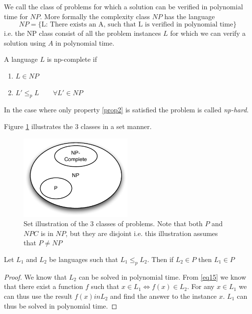 \documentclass[10pt]{article}
\begin{document}
We call the class of problems for which a solution can be verified in polynomial time for $NP$. More formally the complexity class $NP$ has the language
\begin{equation}
  NP = \{\text{L: There exists an A, such that L is verified in polynomial time}\}
\end{equation}
i.e. the NP class consist of all the problem instances $L$ for which we can verify a solution using $A$ in polynomial time.

A language $L$ is np-complete if 
\begin{enumerate}
  \item $L \in NP$
  \item $L' \leq_p L \qquad \forall L' \in NP$ \label{prop2}
\end{enumerate}
In the case where only property \ref{prop2} is satisfied the problem is called \emph{np-hard}.

Figure \ref{fig5} illustrates the 3 classes in a set manner.
\begin{figure}[ht]
\centering
\includegraphics[width=0.5\textwidth]{figures/fig5.pdf}
\caption{Set illustration of the 3 classes of problems. Note that both $P$ and $NPC$ is in $NP$, but they are disjoint i.e. this illustration assumes that $P \neq NP$}
\label{fig5}
\end{figure}


\begin{theorem}
Let $L_1$ and $L_2$ be languages such that $L_1 \leq_p L_2$. Then if $L_2 \in P$ then $L_1 \in P$  
\label{theorem1}
\end{theorem}

\begin{proof}
We know that $L_2$ can be solved in polynomial time. From \ref{eq15} we know that there exist a function $f$ such that $x \in L_1 \Leftrightarrow f(x) \in L_2$. For any $x \in L_1$ we can thus use the result $f(x) in L_2$ and find the answer to the instance $x$. $L_1$ can thus be solved in polynomial time.  
\end{proof}
\end{document}
